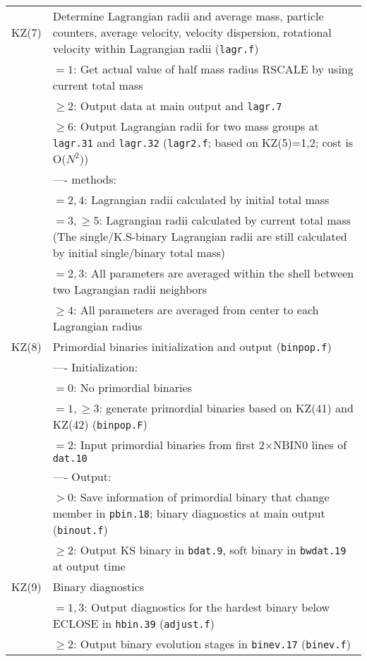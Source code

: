 \begin{longtable}{@{}p{1.5cm}p{13.0cm}}
KZ(7)   & Determine Lagrangian radii and average mass, particle counters, average velocity, velocity dispersion, rotational velocity within Lagrangian radii (\texttt{lagr.f})\\
        & $=1$: Get actual value of half mass radius RSCALE by using current total mass\\
        & $\ge 2$: Output data at main output and \texttt{lagr.7} \\
        & $\ge 6$: Output Lagrangian radii for two mass groups at \texttt{lagr.31} and \texttt{lagr.32} (\texttt{lagr2.f}; based on KZ(5)=1,2; cost is O($N^2$))\\
        & ---- methods:\\
        & $=2,4$: Lagrangian radii calculated by initial total mass \\
        & $=3,\ge 5$: Lagrangian radii calculated by current total mass (The single/K.S-binary Lagrangian radii are still calculated by initial single/binary total mass)\\
        & $=2,3$: All parameters are averaged within the shell between two Lagrangian radii neighbors \\
        & $\ge 4$: All parameters are averaged from center to each Lagrangian radius\\
KZ(8)   & Primordial binaries initialization and output (\texttt{binpop.f})\\
        & ---- Initialization:\\
        & $=0$: No primordial binaries \\
        & $=1,\ge 3$: generate primordial binaries based on KZ(41) and KZ(42) (\texttt{binpop.F}) \\
        & $=2$: Input primordial binaries from first 2$\times$NBIN0 lines of \texttt{dat.10} \\
        & ---- Output:\\
        & $>0$: Save information of primordial binary that change member in \texttt{pbin.18}; binary diagnostics at main output (\texttt{binout.f}) \\
        & $\ge 2$: Output KS binary in \texttt{bdat.9}, soft binary in \texttt{bwdat.19} at output time\\
KZ(9)   & Binary diagnostics \\
        & $=1,3$: Output diagnostics for the hardest binary below ECLOSE in \texttt{hbin.39} (\texttt{adjust.f}) \\
        & $\ge 2$: Output binary evolution stages in \texttt{binev.17} (\texttt{binev.f}) \\

\end{longtable}
